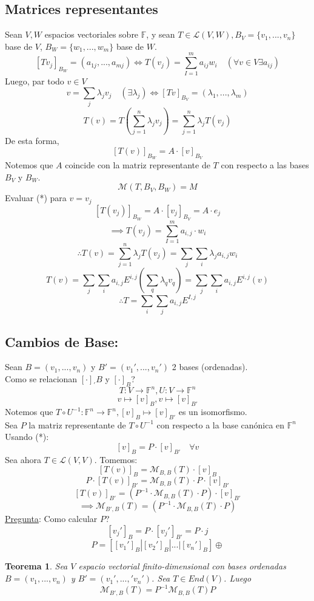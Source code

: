 \documentclass[11pt]{book}
\newtheorem{thm}{Teorema}[section]
\theoremstyle{definition}
\begin{document}
\subsection{Matrices representantes}
Sean $V,W$ espacios vectoriales sobre $\mathbb{F}$, y sean $T\in\mathcal{L}(V,W),B_V=\{v_1,...,v_n\}$ base de $V$, $B_W=\{w_1,...,w_m\}$ base de $W$.
\[ [Tv_j]_{B_W}=(a_{1j},...,a_{mj})\iff T(v_j)=\sum^m_{I=1}a_{ij}w_i\quad (\forall v\in V \exists a_{ij})\]
Luego, par todo $v\in V$
\[v=\sum_j\lambda_jv_j\quad(\exists \lambda_j)\iff [Tv]_{B_V}=(\lambda_{1},...,\lambda_{m})\]
\[T(v)=T\left(\sum^n_{j=1}\lambda_j v_j\right)=\sum^n_{j=1}\lambda_jT(v_j)\]
De esta forma,
\[ [T(v)]_{B_W}=A\cdot [v]_{B_V}\]
Notemos que $A$ coincide con la matriz representante de $T$ con respecto a las bases $B_V$ y $B_W$.
\[\mathcal{M}(T,B_V,B_W)=M\]
Evaluar (*) para $v=v_j$
\[[T(v_j)]_{B_W}=A\cdot[v_j]_{B_V}=A\cdot e_j\]
\[\implies T(v_j)=\sum^m_{I=1}a_{i,j}\cdot w_i\]
\[\therefore T(v)=\sum^n_{j=1}\lambda_jT(v_j)=\sum_j\sum_i\lambda_ja_{i,j}w_i\]
\[T(v)=\sum_j\sum_ia_{i,j}E^{i,j}(\sum_q\lambda_qv_q)=\sum_j\sum_ia_{i,j}E^{i,j}(v)\]
\[\therefore T=\sum_i\sum_ja_{i,j}E^{I,j}\]
\subsection{Cambios de Base:}
Sean $B=(v_1,...,v_n)$ y $B'=(v_1',...,v_n')$ 2 bases (ordenadas).\\
Como se relacionan $[\cdot ]_{'}B$ y $[\cdot ]_{B}$?
\[ T:V\rightarrow\mathbb{F}^n,U:V\rightarrow\mathbb{F}^n\]
\[v\mapsto [v]_B,v\mapsto [v]_{B'}\]
Notemos que $T\circ U^{-1}:\mathbb{F}^n\rightarrow\mathbb{F}^n,[v]_B\mapsto [v]_{B'}$ es un isomorfismo.\\
Sea $P$ la matriz representante de $T\circ U^{-1}$ con respecto a la base canónica en $\mathbb{F}^n$\\
Usando (*):
\[ [v]_B=P\cdot [v]_{B'}\quad \forall v\]
Sea ahora $T\in\mathcal{L}(V,V)$. Tomemos:
\[[T(v)]_B=\mathcal{M}_{B,B}(T)\cdot [v]_B\]
\[ P\cdot [T(v)]_{B'}=\mathcal{M}_{B,B}(T)\cdot P\cdot [v]_{B'}\]
\[[T(v)]_{B'}=\left(P^{-1}\cdot\mathcal{M}_{B,B}(T)\cdot P\right)\cdot [v]_{B'}\]
\[\implies \mathcal{M}_{B',B}(T)=\left(P^{-1}\cdot\mathcal{M}_{B,B}(T)\cdot P\right)\]
\underline{Pregunta}: Como calcular $P$?
\[ [v_j']_B=P\cdot [v_j']_{B'}=P\cdot j\]
\[ P=\left[ [v_1']_B| [v_2']_B|...|[v_n']_B\right]\oplus\]
\begin{thm}
	Sea $V$ espacio vectorial finito-dimensional con bases ordenadas $B=(v_1,...,v_n)$ y $B'=(v_1',...,'v_n')$. Sea $T\in End(V)$. Luego
	\[\mathcal{M}_{B',B}(T)=P^{-1}\mathcal{M}_{B,B}(T)P\]
\end{thm}
\end{document}
